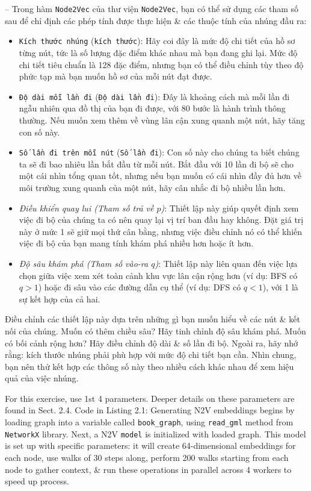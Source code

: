 \documentclass{article}
\begin{document}
\begin{itemize}
\begin{itemize}
\begin{itemize}
           -- Trong hàm {\tt Node2Vec} của thư viện {\tt Node2Vec}, bạn có thể sử dụng các tham số sau để chỉ định các phép tính được thực hiện \& các thuộc tính của nhúng đầu ra:
           \begin{itemize}
               \item {\tt Kích thước nhúng} ({\tt kích thước}): Hãy coi đây là mức độ chi tiết của hồ sơ từng nút, tức là số lượng đặc điểm khác nhau mà bạn đang ghi lại. Mức độ chi tiết tiêu chuẩn là 128 đặc điểm, nhưng bạn có thể điều chỉnh tùy theo độ phức tạp mà bạn muốn hồ sơ của mỗi nút đạt được.
               \item {\tt Độ dài mỗi lần đi} ({\tt Độ dài lần đi}): Đây là khoảng cách mà mỗi lần đi ngẫu nhiên qua đồ thị của bạn đi được, với 80 bước là hành trình thông thường. Nếu muốn xem thêm về vùng lân cận xung quanh một nút, hãy tăng con số này.
               \item {\tt Số lần đi trên mỗi nút} ({\tt Số lần đi}): Con số này cho chúng ta biết chúng ta sẽ đi bao nhiêu lần bắt đầu từ mỗi nút. Bắt đầu với 10 lần đi bộ sẽ cho một cái nhìn tổng quan tốt, nhưng nếu bạn muốn có cái nhìn đầy đủ hơn về môi trường xung quanh của một nút, hãy cân nhắc đi bộ nhiều lần hơn.
               \item {\it Điều khiển quay lui (Tham số trả về $p$)}: Thiết lập này giúp quyết định xem việc đi bộ của chúng ta có nên quay lại vị trí ban đầu hay không. Đặt giá trị này ở mức 1 sẽ giữ mọi thứ cân bằng, nhưng việc điều chỉnh nó có thể khiến việc đi bộ của bạn mang tính khám phá nhiều hơn hoặc ít hơn.
               \item {\it Độ sâu khám phá (Tham số vào-ra $q$)}: Thiết lập này liên quan đến việc lựa chọn giữa việc xem xét toàn cảnh khu vực lân cận rộng hơn (ví dụ: BFS có $q > 1$) hoặc đi sâu vào các đường dẫn cụ thể (ví dụ: DFS có $q < 1$), với 1 là sự kết hợp của cả hai.
           \end{itemize}
           Điều chỉnh các thiết lập này dựa trên những gì bạn muốn hiểu về các nút \& kết nối của chúng. Muốn có thêm chiều sâu? Hãy tinh chỉnh độ sâu khám phá. Muốn có bối cảnh rộng hơn? Hãy điều chỉnh độ dài \& số lần đi bộ. Ngoài ra, hãy nhớ rằng: kích thước nhúng phải phù hợp với mức độ chi tiết bạn cần. Nhìn chung, bạn nên thử kết hợp các thông số này theo nhiều cách khác nhau để xem hiệu quả của việc nhúng.

           For this exercise, use 1st 4 parameters. Deeper details on these parameters are found in Sect. 2.4. Code in {\sf Listing 2.1: Generating N2V embeddings} begins by loading graph into a variable called \verb|book_graph|, using \verb|read_gml| method from {\tt NetworkX} library. Next, a N2V {\tt model} is initialized with loaded graph. This model is set up with specific parameters: it will create 64-dimensional embeddings for each node, use walks of 30 steps along, perform 200 walks starting from each node to gather context, \& run these operations in parallel across 4 workers to speed up process.


\end{itemize}
\end{itemize}
\end{itemize}
\end{document}

